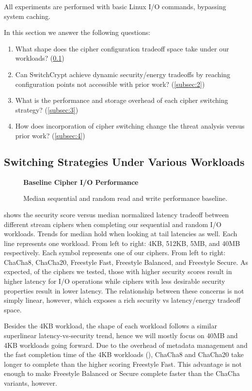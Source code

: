 All experiments are performed with basic Linux I/O commands, bypassing system
caching.

In this section we answer the following questions:

\begin{enumerate}
 \item What shape does the cipher configuration tradeoff space take under
 our workloads? (\cref{subsec:1})
 \item Can SwitchCrypt achieve dynamic security/energy tradeoffs by reaching
 configuration points not accessible with prior work? (\cref{subsec:2})
 \item What is the performance and storage overhead of each cipher switching
 strategy? (\cref{subsec:3})
 \item How does incorporation of cipher switching change the threat analysis
 versus prior work? (\cref{subsec:4})
\end{enumerate}

\subsection{Switching Strategies Under Various Workloads}\label{subsec:1}

\begin{figure}[ht]
  \textbf{Baseline Cipher I/O Performance}\par\medskip
  {} \caption{Median sequential and random
  read and write performance baseline.}
 \label{fig:tradeoff-no-ratios}
\end{figure}

 shows the security score versus median normalized
latency tradeoff between different stream ciphers when completing our sequential
and random I/O workloads. Trends for median hold when looking at tail latencies
as well. Each line represents one workload. From left to right: 4KB, 512KB, 5MB,
and 40MB respectively. Each symbol represents one of our ciphers. From left to
right: ChaCha8, ChaCha20, Freestyle Fast, Freestyle Balanced, and Freestyle
Secure. As expected, of the ciphers we tested, those with higher security scores
result in higher latency for I/O operations while ciphers with less desirable
security properties result in lower latency. The relationship between these
concerns is not simply linear, however, which exposes a rich security vs
latency/energy tradeoff space.

Besides the 4KB workload, the shape of each workload follows a similar
superlinear latency-vs-security trend, hence we will mostly focus on 40MB and
4KB workloads going forward. Due to the overhead of metadata management and the
fast completion time of the 4KB workloads (), ChaCha8 and ChaCha20 take longer to complete than the higher scoring
Freestyle Fast. This advantage is not enough to make Freestyle Balanced or
Secure complete faster than the ChaCha variants, however.

